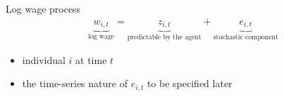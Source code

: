 \documentclass{beamer}
\begin{document}
\begin{frame}{Log wage process}
	\begin{equation*}
		\begin{split}
			\underbrace{w_{i,t}}_{\text{log wage}} = \underbrace{z_{i,t}}_{\text{predictable by the agent}}  + \underbrace{e_{i,t}}_{\text{stochastic component}}
		\end{split} 
	\end{equation*}
	
	\begin{itemize}
		\item individual \(i\) at time \(t\) 
		\item the time-series nature of $e_{i,t}$ to be specified later
	\end{itemize}
\end{frame}
\end{document}
